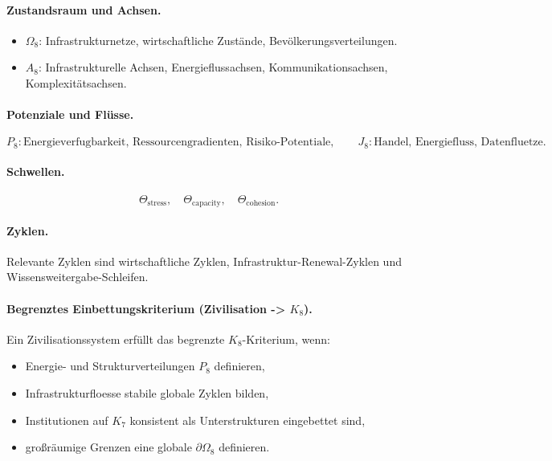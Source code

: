 \paragraph{Zustandsraum und Achsen.}
\begin{itemize}
  \item \(\Omega_8\): Infrastrukturnetze, wirtschaftliche Zustände,
        Bevölkerungsverteilungen.
  \item \(A_8\): Infrastrukturelle Achsen, Energieflussachsen,
        Kommunikationsachsen, Komplexitätsachsen.
\end{itemize}

\paragraph{Potenziale und Flüsse.}
\[
  P_8: \text{Energieverfugbarkeit, Ressourcengradienten, Risiko-Potentiale},\qquad
  J_8: \text{Handel, Energiefluss, Datenfluetze}.
\]

\paragraph{Schwellen.}
\[
  \Theta_{\mathrm{stress}},\quad
  \Theta_{\mathrm{capacity}},\quad
  \Theta_{\mathrm{cohesion}}.
\]

\paragraph{Zyklen.}
Relevante Zyklen sind wirtschaftliche Zyklen, Infrastruktur-Renewal-Zyklen
und Wissensweitergabe-Schleifen.

\paragraph{Begrenztes Einbettungskriterium (Zivilisation -> \texorpdfstring{\(K_8\)}{K8}).}
Ein Zivilisationssystem erfüllt das begrenzte \(K_8\)-Kriterium, wenn:
\begin{itemize}
  \item Energie- und Strukturverteilungen \(P_8\) definieren,
  \item Infrastrukturfloesse stabile globale Zyklen bilden,
  \item Institutionen auf \(K_7\) konsistent als Unterstrukturen eingebettet sind,
  \item großräumige Grenzen eine globale \(\partial\Omega_8\) definieren.
\end{itemize}

